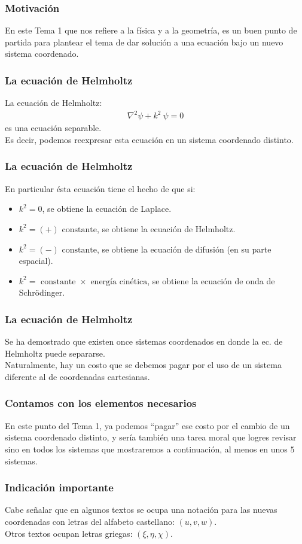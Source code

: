 \documentclass[12pt]{beamer}
\begin{document}
\begin{frame}
\frametitle{Motivación}
En este Tema 1 que nos refiere a la física y a la geometría, es un buen punto de partida para plantear el tema de dar solución a una ecuación bajo un nuevo sistema coordenado.
\end{frame}
\begin{frame}
\frametitle{La ecuación de Helmholtz}
La ecuación de Helmholtz:
\pause
\begin{align*}
\nabla^{2} \psi + k^{2} \: \psi = 0
\end{align*}
es una ecuación separable.
\\
\bigskip
\pause
Es decir, podemos reexpresar esta ecuación en un sistema coordenado distinto.
\end{frame}
\begin{frame}
\frametitle{La ecuación de Helmholtz}
En particular ésta ecuación tiene el hecho de que si:
\pause
\begin{itemize}[<+->]
\item[\ding{212}] $k^{2} = 0$, se obtiene la ecuación de Laplace.
\item[\ding{212}] $k^{2} = (+) \mbox{ constante}$, se obtiene la ecuación de Helmholtz.
\item[\ding{212}] $k^{2} = (-) \mbox{ constante}$, se obtiene la ecuación de difusión (en su parte espacial).
\item[\ding{212}] $k^{2} = \mbox{ constante } \times \mbox{ energía cinética}$, se obtiene la ecuación de onda de Schrödinger.
\end{itemize}
\end{frame}
\begin{frame}
\frametitle{La ecuación de Helmholtz}
Se ha demostrado que existen once sistemas coordenados en donde la ec. de Helmholtz puede separarse. 
\\
\bigskip
\pause
Naturalmente, hay un costo que se debemos pagar por el uso de un sistema diferente al de coordenadas cartesianas.
\end{frame}
\begin{frame}
\frametitle{Contamos con los elementos necesarios}
En este punto del Tema 1, ya podemos \enquote{pagar} ese costo por el cambio de un sistema coordenado distinto, y sería también una tarea moral que logres revisar sino en todos los sistemas que mostraremos a continuación, al menos en unos $5$ sistemas.
\end{frame}
\begin{frame}
\frametitle{Indicación importante}
Cabe señalar que en algunos textos se ocupa una notación para las nuevas coordenadas con letras del alfabeto castellano: $(u, v ,w)$.
\\
\bigskip
\pause
Otros textos ocupan letras griegas: $(\xi, \eta, \chi)$.
\end{frame}
\end{document}
